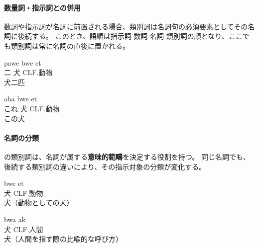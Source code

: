 \paragraph{数量詞・指示詞との併用}

数詞や指示詞が名詞に前置される場合、類別詞は名詞句の必須要素としてその名詞に後続する。
このとき、語順は指示詞-数詞-名詞-類別詞の順となり、ここでも類別詞は常に名詞の直後に置かれる。
\begin{exe}
\ex \gll pawe bwe et\\
二 犬 CLF.動物\\
\glt 犬二匹
\end{exe}
\begin{exe}
\ex \gll aba bwe et\\
これ 犬 CLF.動物\\
\glt この犬
\end{exe}


\paragraph{名詞の分類}

\langname の類別詞は、名詞が属する\textbf{意味的範疇}を決定する役割を持つ。
同じ名詞でも、後続する類別詞の違いにより、その指示対象の分類が変化する。
\begin{exe}
\ex \gll bwe et\\
犬 CLF.動物\\
\glt 犬（動物としての犬）
\end{exe}
\begin{exe}
\ex \gll bwa ak\\
犬 CLF.人間\\
\glt 犬（人間を指す際の比喩的な呼び方）
\end{exe}